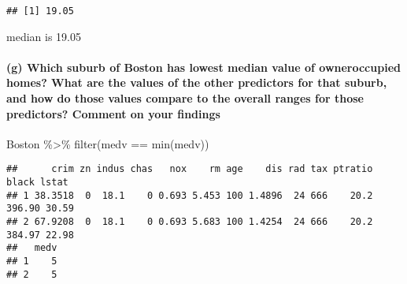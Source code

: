 \documentclass[
]{article}
\newenvironment{Shaded}{\begin{snugshade}}{\end{snugshade}}
\newcommand{\AttributeTok}[1]{\textcolor[rgb]{0.77,0.63,0.00}{#1}}
\newcommand{\DecValTok}[1]{\textcolor[rgb]{0.00,0.00,0.81}{#1}}
\newcommand{\FunctionTok}[1]{\textcolor[rgb]{0.00,0.00,0.00}{#1}}
\newcommand{\NormalTok}[1]{#1}
\newcommand{\OtherTok}[1]{\textcolor[rgb]{0.56,0.35,0.01}{#1}}
\newcommand{\SpecialCharTok}[1]{\textcolor[rgb]{0.00,0.00,0.00}{#1}}
\begin{document}
\begin{Shaded}
\end{Shaded}

\begin{verbatim}
## [1] 19.05
\end{verbatim}

median is 19.05

\hypertarget{g-which-suburb-of-boston-has-lowest-median-value-of-owneroccupied-homes-what-are-the-values-of-the-other-predictors-for-that-suburb-and-how-do-those-values-compare-to-the-overall-ranges-for-those-predictors-comment-on-your-findings}{%
\paragraph{(g) Which suburb of Boston has lowest median value of
owneroccupied homes? What are the values of the other predictors for
that suburb, and how do those values compare to the overall ranges for
those predictors? Comment on your
findings}\label{g-which-suburb-of-boston-has-lowest-median-value-of-owneroccupied-homes-what-are-the-values-of-the-other-predictors-for-that-suburb-and-how-do-those-values-compare-to-the-overall-ranges-for-those-predictors-comment-on-your-findings}}

\begin{Shaded}
\begin{Highlighting}[]
\NormalTok{Boston }\SpecialCharTok{\%\textgreater{}\%} 
  \FunctionTok{filter}\NormalTok{(medv }\SpecialCharTok{==} \FunctionTok{min}\NormalTok{(medv))}
\end{Highlighting}
\end{Shaded}

\begin{verbatim}
##      crim zn indus chas   nox    rm age    dis rad tax ptratio  black lstat
## 1 38.3518  0  18.1    0 0.693 5.453 100 1.4896  24 666    20.2 396.90 30.59
## 2 67.9208  0  18.1    0 0.693 5.683 100 1.4254  24 666    20.2 384.97 22.98
##   medv
## 1    5
## 2    5
\end{verbatim}
\end{document}
